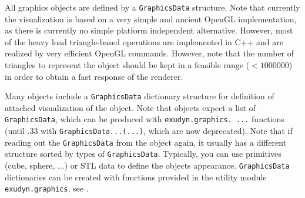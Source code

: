 \newpage %
All graphics objects are defined by a \texttt{GraphicsData} structure. %
Note that currently the visualization is based on a very simple and ancient OpenGL implementation, as there is currently no simple platform independent alternative. However, most of the heavy load triangle-based operations are implemented in C++ and are realized by very efficient OpenGL commands. However, note that the number of triangles to represent the object should be kept in a feasible range ($<1000000$) in order to obtain a fast response of the renderer.

Many objects include a \texttt{GraphicsData} dictionary structure for definition of attached visualization of the object.
Note that objects expect a list of \texttt{GraphicsData}, which can be produced with \texttt{exudyn.graphics. ...} functions (until .33 with \texttt{GraphicsData...(...)}, which are now deprecated). 
Note that if reading out the \texttt{GraphicsData} from the object again, it usually has a different structure sorted by types of \texttt{GraphicsData}.
Typically, you can use primitives (cube, sphere, ...) or \ac{STL} data to define the objects appearance.
\texttt{GraphicsData} dictionaries can be created with functions provided in the utility module \texttt{exudyn.graphics}, see .

